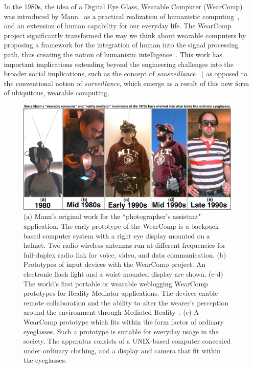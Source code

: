 In the 1980s, the idea of a Digital Eye Glass, Wearable Computer (WearComp) was introduced by 
Mann~\cite{mannaaai361, mann1994mediated, mannwyckofftr, aimone2003eyetap} as a 
practical realization of humanistic computing~\cite{mann2001wearable, 
intelligentimageprocessing,presenceconnect,mann260}, and an extension of human capability for our 
everyday life. The WearComp project significantly transformed the way we think about wearable 
computers by proposing a framework for the integration of human into the signal processing path, 
thus creating the notion of humanistic intelligence~\cite{mann2001wearable, 
intelligentimageprocessing}. This work has important implications extending beyond the engineering 
challenges into the broader social implications, such as the concept of \emph{sousveillance}
~\cite{mann2002sousveillance, mann2004sousveillance, mann2006cyborglogging}) as opposed to 
the conventional notion of \emph{surveillance}, which emerge as a result of this new form of 
ubiquitous, wearable computing. 

\begin{figure}[htb]
\center
 \includegraphics[width=5.5in]{ch1/figures/steve5.jpeg}
 \caption{(a) Mann's original work for the ``photographer's assistant" application. The early prototype 
of the WearComp is a backpack-based computer system with a right eye display mounted on a 
helmet. Two radio wireless antennas run at different frequencies for full-duplex radio link for voice, 
video, and data communication. (b) Prototypes of input devices with the WearComp project. An 
electronic flash light and a waist-mounted display are shown. (c-d) The world's first portable or 
wearable weblogging WearComp prototypes for Reality Mediator applications. The devices enable 
remote collaboration and the ability to alter the wearer's perception around the environment through 
Mediated Reality~\cite{mann1994mediated}. (e) A WearComp prototype which fits within the form 
factor of ordinary eyeglasses. Such a prototype is suitable for everyday usage in the society. The 
apparatus consists of a UNIX-based computer concealed under ordinary clothing, and a display and 
camera that fit within the eyeglasses.}
 \label{fig:mannglass}
\end{figure}

